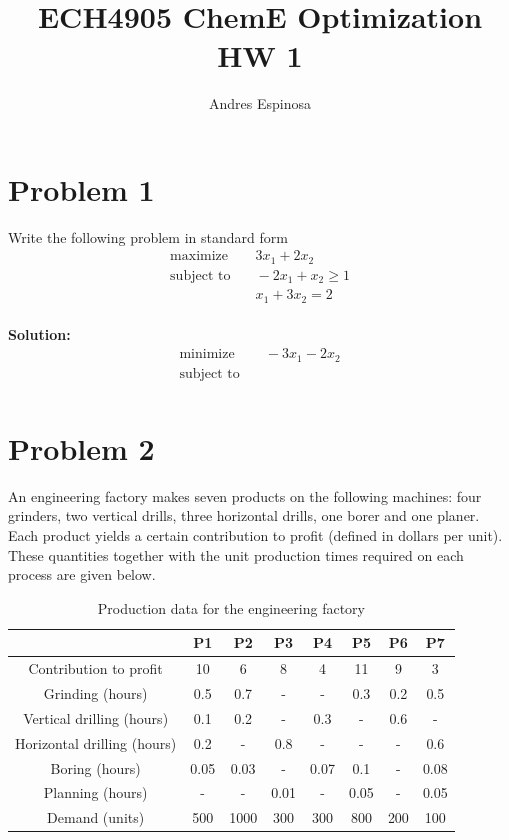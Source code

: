 \documentclass[11pt]{article}
\title{ECH4905 ChemE Optimization HW 1}
\author{Andres Espinosa}
\begin{document}
\maketitle

\section{Problem 1}
Write the following problem in standard form
\begin{align}
  \text{maximize} & \quad 3 x_1 + 2x_2 \\
  \text{subject to} & \quad -2x_1 + x_2 \geq 1 \\
  & \quad x_1 + 3x_2 = 2
\end{align}
\\
\textbf{Solution: }
\begin{align}
  \text{minimize} & \quad -3 x_1 - 2x_2 \\
  \text{subject to} & \quad  \\
  & \quad 
\end{align}

\section{Problem 2}
An engineering factory makes seven products on the following machines: four
grinders, two vertical drills, three horizontal drills, one borer and one planer. Each product
yields a certain contribution to profit (defined in dollars per unit). These quantities together
with the unit production times required on each process are given below.

\begin{table}[h!]
\centering
\begin{tabular}{|c|c|c|c|c|c|c|c|}
\hline
 & P1 & P2 & P3 & P4 & P5 & P6 & P7 \\
\hline
Contribution to profit & 10 & 6 & 8 & 4 & 11 & 9 & 3 \\
\hline
Grinding (hours) & 0.5 & 0.7 & - & - & 0.3 & 0.2 & 0.5 \\
\hline
Vertical drilling (hours) & 0.1 & 0.2 & - & 0.3 & - & 0.6 & - \\
\hline
Horizontal drilling (hours) & 0.2 & - & 0.8 & - & - & - & 0.6 \\
\hline
Boring (hours) & 0.05 & 0.03 & - & 0.07 & 0.1 & - & 0.08 \\
\hline
Planning (hours) & - & - & 0.01 & - & 0.05 & - & 0.05 \\
\hline
Demand (units) & 500 & 1000 & 300 & 300 & 800 & 200 & 100 \\
\hline
\end{tabular}
\caption{Production data for the engineering factory}
\label{tab_problem2}
\end{table}
\end{document}

